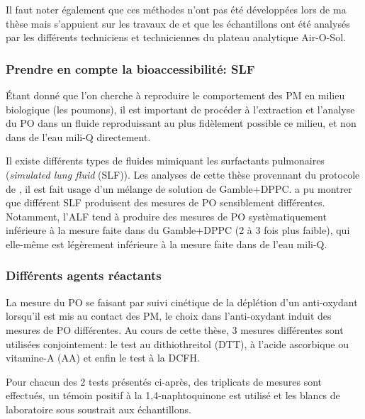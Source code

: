 Il faut noter également que ces méthodes n'ont pas été développées lors de ma thèse mais
s'appuient sur les travaux de \textcite{calasPollution2017} et que les échantillons ont été
analysés par les différents techniciens et techniciennes du plateau analytique Air-O-Sol.

\subsubsection{Prendre en compte la bioaccessibilité: SLF}%
\label{sub:prendre_en_compte_la_bioaccessibilite_slf}

Étant donné que l'on cherche à reproduire le comportement des PM en milieu biologique
(les poumons), il est important de procéder à l'extraction et l'analyse du PO dans un
fluide reproduissant au plus fidèlement possible ce milieu, et non dans de l'eau mili-Q
directement.

Il existe différents types de fluides mimiquant les surfactants pulmonaires (\textit{simulated
lung fluid} (SLF)). Les analyses de cette thèse provennant du protocole de
\textcite{calasPollution2017}, il est fait usage d'un mélange de solution de Gamble+DPPC.
\textcite{calasImportance2017} a pu montrer que différent SLF produisent des mesures de PO
sensiblement différentes. Notamment, l'ALF tend à produire des mesures de PO
systèmatiquement inférieure à la mesure faite dans du Gamble+DPPC (2 à 3 fois plus
faible), qui elle-même est légèrement inférieure à la mesure faite dans de l'eau mili-Q.

\subsubsection{Différents agents réactants}%
\label{ssub:differents_agent_reactant}

La mesure du PO se faisant par suivi cinétique de la déplétion d'un anti-oxydant
lorsqu'il est mis au contact des PM, le choix dans l'anti-oxydant induit des mesures de PO
différentes. Au cours de cette thèse, 3 mesures différentes sont utilisées conjointement:
le test au dithiothreitol (DTT), à l'acide ascorbique ou vitamine-A (AA) et enfin le test à
la DCFH.

Pour chacun des 2 tests présentés ci-après, des triplicats de mesures sont effectués, un
témoin positif à la 1,4-naphtoquinone est utilisé et les blancs de laboratoire sous
soustrait aux échantillons.

